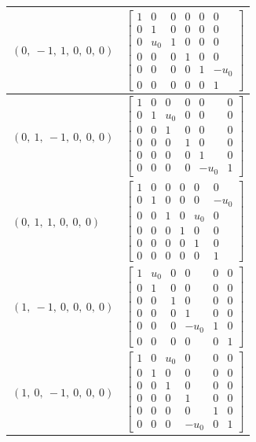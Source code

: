 \documentclass[11pt]{article}
\theoremstyle{definition}
\begin{document}
\begin{longtable}{|l|c|}
    \hline
    $\left( 0, \  -1, \  1, \  0, \  0, \  0\right)$ & ${\left[\begin{matrix}1 & 0 & 0 & 0 & 0 & 0\\0 & 1 & 0 & 0 & 0 & 0\\0 & u_{0} & 1 & 0 & 0 & 0\\0 & 0 & 0 & 1 & 0 & 0\\0 & 0 & 0 & 0 & 1 & - u_{0}\\0 & 0 & 0 & 0 & 0 & 1\end{matrix}\right]}$ \\
    \hline
    $\left( 0, \  1, \  -1, \  0, \  0, \  0\right)$ & ${\left[\begin{matrix}1 & 0 & 0 & 0 & 0 & 0\\0 & 1 & u_{0} & 0 & 0 & 0\\0 & 0 & 1 & 0 & 0 & 0\\0 & 0 & 0 & 1 & 0 & 0\\0 & 0 & 0 & 0 & 1 & 0\\0 & 0 & 0 & 0 & - u_{0} & 1\end{matrix}\right]}$ \\
    \hline
    $\left( 0, \  1, \  1, \  0, \  0, \  0\right)$ & ${\left[\begin{matrix}1 & 0 & 0 & 0 & 0 & 0\\0 & 1 & 0 & 0 & 0 & - u_{0}\\0 & 0 & 1 & 0 & u_{0} & 0\\0 & 0 & 0 & 1 & 0 & 0\\0 & 0 & 0 & 0 & 1 & 0\\0 & 0 & 0 & 0 & 0 & 1\end{matrix}\right]}$ \\
    \hline
    $\left( 1, \  -1, \  0, \  0, \  0, \  0\right)$ & ${\left[\begin{matrix}1 & u_{0} & 0 & 0 & 0 & 0\\0 & 1 & 0 & 0 & 0 & 0\\0 & 0 & 1 & 0 & 0 & 0\\0 & 0 & 0 & 1 & 0 & 0\\0 & 0 & 0 & - u_{0} & 1 & 0\\0 & 0 & 0 & 0 & 0 & 1\end{matrix}\right]}$ \\
    \hline
    $\left( 1, \  0, \  -1, \  0, \  0, \  0\right)$ & ${\left[\begin{matrix}1 & 0 & u_{0} & 0 & 0 & 0\\0 & 1 & 0 & 0 & 0 & 0\\0 & 0 & 1 & 0 & 0 & 0\\0 & 0 & 0 & 1 & 0 & 0\\0 & 0 & 0 & 0 & 1 & 0\\0 & 0 & 0 & - u_{0} & 0 & 1\end{matrix}\right]}$ \\

\end{longtable}
\end{document}
